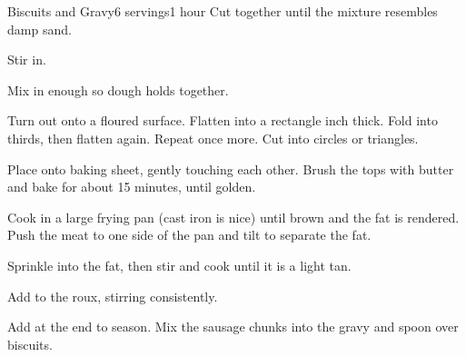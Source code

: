 \documentclass[../Cookbook.tex]{subfiles}
\begin{document}
\begin{recipe}[BiscuitsAndGravy]{Biscuits and Gravy}{6 servings}{1 hour}
Cut together until the mixture resembles damp sand.


Stir in.

Mix in enough so dough holds together.

Turn out onto a floured surface. Flatten into a rectangle  inch thick. Fold into thirds, then flatten again. Repeat once more.
Cut into circles or triangles.

Place onto baking sheet, gently touching each other.
Brush the tops with butter and bake for about 15 minutes, until golden.

Cook in a large frying pan (cast iron is nice) until brown and the fat is rendered.
Push the meat to one side of the pan and tilt to separate the fat.

Sprinkle into the fat, then stir and cook until it is a light tan.

Add to the roux, stirring consistently.

Add at the end to season. Mix the sausage chunks into the gravy and spoon over biscuits.

\end{recipe}
\end{document}
